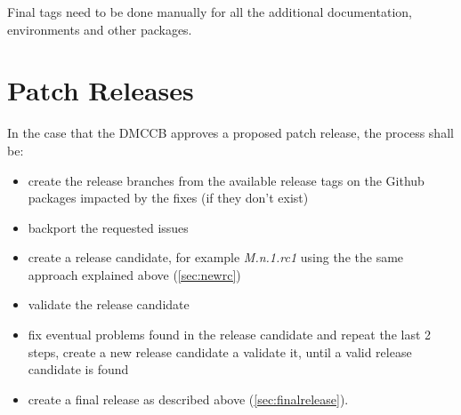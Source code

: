 Final tags need to be done manually for all the additional documentation, environments and other packages.

\newpage

\section{Patch Releases} \label{sec:patchreleases}

In the case that the DMCCB approves a proposed patch release, the process shall be:

\begin{itemize}
\item create the release branches from the available release tags on the Github packages impacted by the fixes (if they don't exist)
\item backport the requested issues
\item create a release candidate, for example \textit{M.n.1.rc1} using the the same approach explained above (\ref{sec:newrc})
\item validate the release candidate
\item fix eventual problems found in the release candidate and repeat the last 2 steps, create a new release candidate a validate it, until a valid release candidate is found
\item create a final release as described above (\ref{sec:finalrelease}).
\end{itemize}


